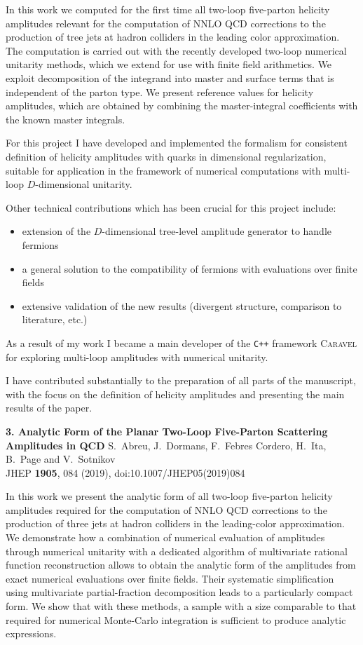 \documentclass[a4paper,10pt]{article}
\newcommand{\paper}[1]{\vspace{3ex}\noindent\large\textbf{#1}\newline}
\begin{document}
  In this work we computed for the first time all two-loop five-parton helicity amplitudes relevant
  for the computation of NNLO QCD corrections to the production of tree jets at hadron colliders in the leading color approximation.
  The computation is carried out with the recently developed two-loop numerical unitarity methods, which we extend for use with finite field arithmetics.
  We exploit decomposition of the integrand into master and surface terms that is independent of the parton type.
  We present reference values for helicity amplitudes, which are obtained by combining the master-integral coefficients with the known master integrals.

  For this project I have developed and implemented the formalism for
  consistent definition of helicity amplitudes with quarks in dimensional regularization,
  suitable for application in the framework of numerical computations with multi-loop $D$-dimensional unitarity.

  Other technical contributions which has been crucial for this project include:
  \begin{itemize}
    \item extension of the $D$-dimensional tree-level amplitude generator to handle fermions
    \item a general solution to the compatibility of fermions with evaluations over finite fields
    \item extensive validation of the new results (divergent structure, comparison to literature, etc.)
  \end{itemize}
  As a result of my work I became a main developer of the \texttt{C++} framework \textsc{Caravel} for exploring multi-loop amplitudes
  with numerical unitarity.

  I have contributed substantially to the preparation of all parts of the manuscript,
  with the focus on the definition of helicity amplitudes and presenting the main results of the paper.

\paper{3. Analytic Form of the Planar Two-Loop Five-Parton Scattering Amplitudes in QCD}
S.~Abreu, J.~Dormans, F.~Febres Cordero, H.~Ita, B.~Page and V.~Sotnikov\\
JHEP {\bf 1905}, 084 (2019), doi:10.1007/JHEP05(2019)084

In this work we present the analytic form of all two-loop five-parton helicity amplitudes
required for the computation of NNLO QCD corrections to the production of three jets at hadron colliders
in the leading-color approximation.
We demonstrate how a combination of numerical evaluation of amplitudes through numerical unitarity with a
dedicated algorithm of multivariate rational function reconstruction allows to obtain
the analytic form of the amplitudes from exact numerical evaluations over finite fields.
Their systematic simplification using multivariate partial-fraction decomposition
leads to a particularly compact form. We show that with these methods, a sample with a size comparable to that
required for numerical Monte-Carlo integration is sufficient to produce analytic expressions.
\end{document}
